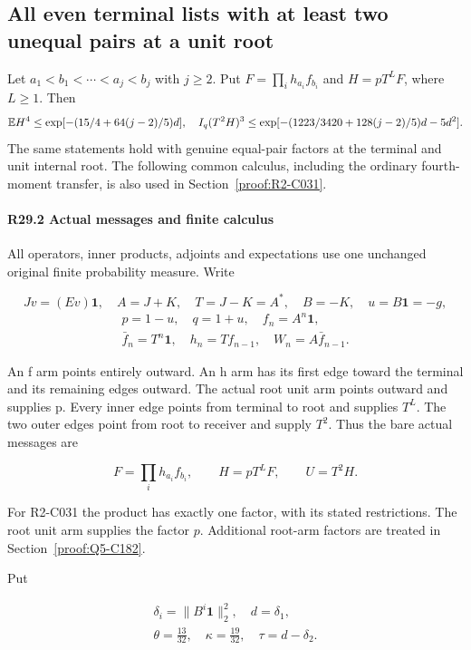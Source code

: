 \subsection{All even terminal lists with at least two unequal pairs at a unit root}\label{proof:R2-C029}
Let $a_1<b_1<\cdots<a_j<b_j$ with $j\ge2$. Put $F=\prod_i h_{a_i}f_{b_i}$ and $H=pT^LF$, where $L\ge1$. Then
\[
\mathbb E H^4\le\exp[-(15/4+64(j-2)/5)d],\quad
I_q(T^2H)^3\le\exp[-(1223/3420+128(j-2)/5)d-5d^2].
\]
The same statements hold with genuine equal-pair factors at the terminal and unit internal root. The following common calculus, including the ordinary fourth-moment transfer, is also used in Section~\ref{proof:R2-C031}.

\paragraph{R29.2 Actual messages and finite calculus}

All operators, inner products, adjoints and expectations use one unchanged
original finite probability measure. Write

\[
Jv=(Ev)\mathbf1,\quad A=J+K,\quad T=J-K=A^*,\quad
B=-K,\quad u=B\mathbf1=-g,
\]
\[
\begin{gathered}
p=1-u,\quad q=1+u,\quad f_n=A^n\mathbf1,\quad\\
\bar f_n=T^n\mathbf1,\quad h_n=Tf_{n-1},\quad W_n=A\bar f_{n-1}.
\end{gathered}
\]

An f arm points entirely outward. An h arm has its first edge toward
the terminal and its remaining edges outward. The actual root unit arm
points outward and supplies p. Every inner edge points from terminal to
root and supplies \(T^L.\) The two outer edges point from root to receiver
and supply \(T^2.\) Thus the bare actual messages are

\[
F=\prod_i h_{a_i}f_{b_i},\qquad H=pT^LF,\qquad U=T^2H.
\tag{R29.2.1}
\]

For R2-C031 the product has exactly one factor, with its stated restrictions.
The root unit arm supplies the factor $p$. Additional root-arm factors are treated in Section~\ref{proof:Q5-C182}.

Put

\[
\begin{gathered}
\delta_i=\|B^i\mathbf1\|_2^2,\quad d=\delta_1,\quad\\
\theta=\frac{13}{32},\quad \kappa=\frac{19}{32},\quad \tau=d-\delta_2.
\end{gathered}
\]

